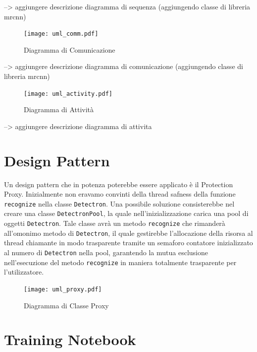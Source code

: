 \documentclass[12pt,a4paper]{article}
\begin{document}
--> aggiungere descrizione diagramma di sequenza (aggiungendo classe di libreria mrcnn)

\begin{figure}[p]
    \caption{Diagramma di Comunicazione}
    \centering
    \texttt{[image: uml\_comm.pdf]}
\end{figure}

--> aggiungere descrizione diagramma di comunicazione (aggiungendo classe di libreria mrcnn)

\begin{figure}[p]
    \caption{Diagramma di Attività}
    \centering
    \texttt{[image: uml\_activity.pdf]}
\end{figure}

--> aggiungere descrizione diagramma di attivita

\pagebreak

\section{Design Pattern}

Un design pattern che in potenza poterebbe essere applicato è il
Protection Proxy. Inizialmente non eravamo convinti della thread safness
della funzione \texttt{recognize} nella classe \texttt{Detectron}. Una
possibile soluzione consisterebbe nel creare una classe
\texttt{DetectronPool}, la quale nell'inizializzazione carica una pool
di oggetti \texttt{Detectron}. Tale classe avrà un metodo
\texttt{recognize} che rimanderà all'omonimo metodo di
\texttt{Detectron}, il quale gestirebbe l'allocazione della risorsa al
thread chiamante in modo trasparente tramite un semaforo contatore
inizializzato al numero di \texttt{Detectron} nella pool, garantendo la
mutua esclusione nell'esecuzione del metodo \texttt{recognize} in
maniera totalmente trasparente per l'utilizzatore.

\begin{figure}[h]
    \caption{Diagramma di Classe Proxy}
    \centering
    \texttt{[image: uml\_proxy.pdf]}
\end{figure}

\pagebreak

\section{Training Notebook} %
\end{document}
